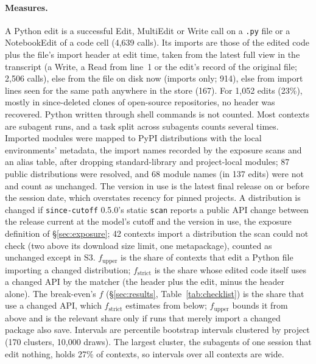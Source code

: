 \documentclass[11pt]{article}
\newcommand{\tool}{\texttt{since-cutoff}\xspace}
\newcommand{\code}[1]{\texttt{#1}}
\begin{document}
\paragraph{Measures.}
A Python edit is a successful Edit, MultiEdit or Write call on a \code{.py} file or a NotebookEdit of a code cell (4,639 calls). Its imports are those of the edited code plus the file's import header at edit time, taken from the latest full view in the transcript (a Write, a Read from line~1 or the edit's record of the original file; 2,506 calls), else from the file on disk now (imports only; 914), else from import lines seen for the same path anywhere in the store (167). For 1,052 edits (23\%), mostly in since-deleted clones of open-source repositories, no header was recovered. Python written through shell commands is not counted. Most contexts are subagent runs, and a task split across subagents counts several times.
Imported modules were mapped to PyPI distributions with the local environments' metadata, the import names recorded by the exposure scans and an alias table, after dropping standard-library and project-local modules; 87 public distributions were resolved, and 68 module names (in 137 edits) were not and count as unchanged.
The version in use is the latest final release on or before the session date, which overstates recency for pinned projects. A distribution is changed if \tool 0.5.0's static \code{scan} reports a public API change between the release current at the model's cutoff and the version in use, the exposure definition of \S\ref{sec:exposure}; 42 contexts import a distribution the scan could not check (two above its download size limit, one metapackage), counted as unchanged except in S3.
$f_\text{upper}$ is the share of contexts that edit a Python file importing a changed distribution; $f_\text{strict}$ is the share whose edited code itself uses a changed API by the matcher (the header plus the edit, minus the header alone). The break-even's $f$ (\S\ref{sec:results}, Table~\ref{tab:checklist}) is the share that use a changed API, which $f_\text{strict}$ estimates from below; $f_\text{upper}$ bounds it from above and is the relevant share only if runs that merely import a changed package also save.
Intervals are percentile bootstrap intervals clustered by project (170 clusters, 10,000 draws). The largest cluster, the subagents of one session that edit nothing, holds 27\% of contexts, so intervals over all contexts are wide.
\end{document}
